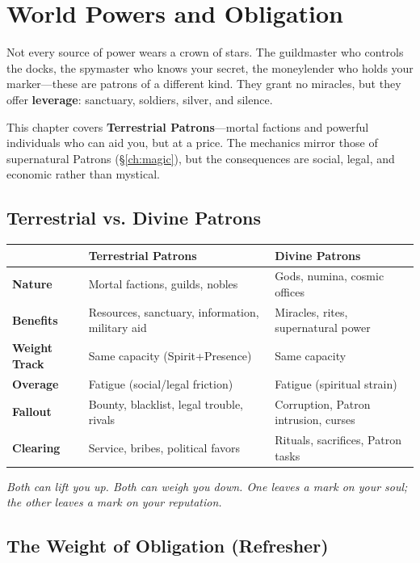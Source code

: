 \chapter{World Powers and Obligation}
\label{ch:world-powers-obligation}

Not every source of power wears a crown of stars. The guildmaster who controls the docks, the spymaster who knows your secret, the moneylender who holds your marker—these are patrons of a different kind. They grant no miracles, but they offer \textbf{leverage}: sanctuary, soldiers, silver, and silence.

This chapter covers \textbf{Terrestrial Patrons}—mortal factions and powerful individuals who can aid you, but at a price. The mechanics mirror those of supernatural Patrons (\S\ref{ch:magic}), but the consequences are social, legal, and economic rather than mystical.

\section{Terrestrial vs. Divine Patrons}

\begin{center}
\begin{tabular}{p{4cm}p{5cm}p{5cm}}
\toprule
& \textbf{Terrestrial Patrons} & \textbf{Divine Patrons} \\
\midrule
\textbf{Nature} & Mortal factions, guilds, nobles & Gods, numina, cosmic offices \\
\textbf{Benefits} & Resources, sanctuary, information, military aid & Miracles, rites, supernatural power \\
\textbf{Weight Track} & Same capacity (Spirit+Presence) & Same capacity \\
\textbf{Overage} & Fatigue (social/legal friction) & Fatigue (spiritual strain) \\
\textbf{Fallout} & Bounty, blacklist, legal trouble, rivals & Corruption, Patron intrusion, curses \\
\textbf{Clearing} & Service, bribes, political favors & Rituals, sacrifices, Patron tasks \\
\bottomrule
\end{tabular}
\end{center}

\emph{Both can lift you up. Both can weigh you down. One leaves a mark on your soul; the other leaves a mark on your reputation.}

\section{The Weight of Obligation (Refresher)}

